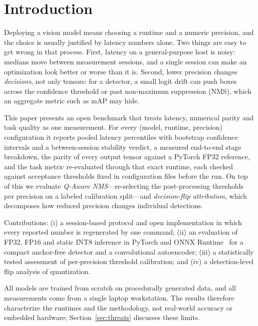 \documentclass[conference]{IEEEtran}
\begin{document}
\section{Introduction}
Deploying a vision model means choosing a runtime and a numeric precision, and the choice is usually justified by
latency numbers alone. Two things are easy to get wrong in that process. First, latency on a general-purpose host is
noisy: medians move between measurement sessions, and a single session can make an optimization look better or
worse than it is. Second, lower precision changes \emph{decisions}, not only tensors: for a detector, a small logit
drift can push boxes across the confidence threshold or past non-maximum suppression (NMS), which an aggregate metric
such as mAP may hide.

This paper presents an open benchmark that treats latency, numerical parity and task quality as one measurement.
For every (model, runtime, precision) configuration it reports pooled latency percentiles with bootstrap confidence
intervals and a between-session stability verdict, a measured end-to-end stage breakdown, the parity of every output
tensor against a PyTorch FP32 reference, and the task metric re-evaluated through that exact runtime, each checked
against acceptance thresholds fixed in configuration files before the run. On top of this we evaluate
\emph{Q-Aware NMS}---re-selecting the post-processing thresholds per precision on a labeled calibration split---and
\emph{decision-flip attribution}, which decomposes how reduced precision changes individual detections.

Contributions: (i) a session-based protocol and open implementation in which every reported number is regenerated
by one command; (ii) an evaluation of FP32, FP16 and static INT8 inference in PyTorch and ONNX Runtime~\cite{onnxruntime}
for a compact anchor-free detector and a convolutional autoencoder; (iii) a statistically tested assessment of
per-precision threshold calibration; and (iv) a detection-level flip analysis of quantization.

All models are trained from scratch on procedurally generated data, and all measurements come from a single laptop
workstation. The results therefore characterize the runtimes and the methodology, not real-world accuracy or embedded
hardware; Section~\ref{sec:threats} discusses these limits.
\end{document}
